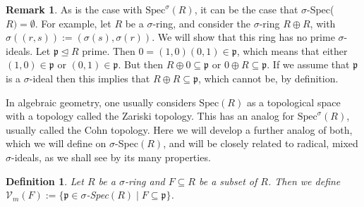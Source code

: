 \documentclass{article}
\def\I{\mathbb{I}}
\def\Vm{\mathcal{V}_m}
\def\p{\mathfrak{p}}
\def\s{\sigma}
\def\Spec{\text{Spec}}
\theoremstyle{plain}
\newtheorem{defn}[Satz]{Definition}
\theoremstyle{definition}
\newtheorem{rem}[Satz]{Remark}
\begin{document}
\begin{rem}
As is the case with $\Spec^\s(R)$, it can be the case that $\s$-Spec($R)= \emptyset$. For example, let $R$ be a $\s$-ring, and consider the $\s$-ring $R \oplus R$, with $\s( (r,s)):= (\s(s),\s(r))$. 
We will show that this ring has no prime $\s$-ideals. Let $\p \unlhd R$ prime. Then $0 = (1,0)(0,1) \in \p$, which means that either $(1,0) \in \p$ or $(0,1) \in \p$. But then $R \oplus 0 \subseteq \p$ or $0 \oplus R \subseteq \p$. If we assume that $\p$ is a $\s$-ideal then
 this implies that $R \oplus R \subseteq \p$, which cannot be, by definition.
\end{rem}

In algebraic geometry, one usually considers $\Spec(R)$ as a topological space with a topology called the Zariski topology. This has an analog for $\Spec^\s(R)$, usually called the Cohn topology. Here we will develop a further analog of both,
 which we will define on $\s$-Spec$(R)$, and will be closely related to radical, mixed $\s$-ideals, as we shall see by its many properties.

\begin{defn}
Let $R$ be a $\s$-ring and $F \subseteq R$ be a subset of $R$. Then we define $\Vm (F):= \{ \p \in \s$-Spec$(R) \mid F \subseteq \p \}$. 
\end{defn}
\end{document}
